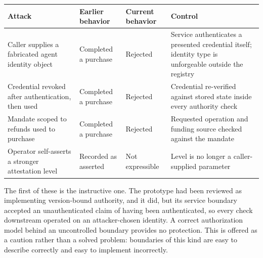 \documentclass[
  11pt,
  letterpaper,
]{article}
\newcounter{none} %
\begin{document}
{\def\LTcaptype{none} %
\begin{longtable}[]{@{}
  >{\raggedright\arraybackslash}p{}
  >{\raggedright\arraybackslash}p{}
  >{\raggedright\arraybackslash}p{}
  >{\raggedright\arraybackslash}p{}@{}}
\toprule\noalign{}
\begin{minipage}[b]{\linewidth}\raggedright
Attack
\end{minipage} & \begin{minipage}[b]{\linewidth}\raggedright
Earlier behavior
\end{minipage} & \begin{minipage}[b]{\linewidth}\raggedright
Current behavior
\end{minipage} & \begin{minipage}[b]{\linewidth}\raggedright
Control
\end{minipage} \\
\midrule\noalign{}
\endhead
\bottomrule\noalign{}
\endlastfoot
Caller supplies a fabricated agent identity object & Completed a
purchase & Rejected & Service authenticates a presented credential
itself; identity type is unforgeable outside the registry \\
Credential revoked after authentication, then used & Completed a
purchase & Rejected & Credential re-verified against stored state inside
every authority check \\
Mandate scoped to refunds used to purchase & Completed a purchase &
Rejected & Requested operation and funding source checked against the
mandate \\
Operator self-asserts a stronger attestation level & Recorded as
asserted & Not expressible & Level is no longer a caller-supplied
parameter \\
\end{longtable}
}

The first of these is the instructive one. The prototype had been
reviewed as implementing version-bound authority, and it did, but its
service boundary accepted an unauthenticated claim of having been
authenticated, so every check downstream operated on an attacker-chosen
identity. A correct authorization model behind an uncontrolled boundary
provides no protection. This is offered as a caution rather than a
solved problem: boundaries of this kind are easy to describe correctly
and easy to implement incorrectly.
\end{document}
